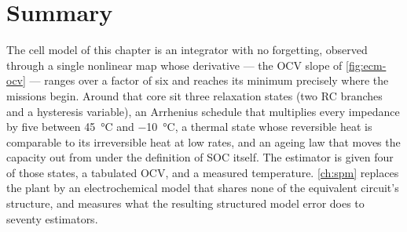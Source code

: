 \section{Summary}

The cell model of this chapter is an integrator with no forgetting, observed through a single
nonlinear map whose derivative --- the OCV slope of \cref{fig:ecm-ocv} --- ranges over a factor of
six and reaches its minimum precisely where the missions begin. Around that core sit three
relaxation states (two RC branches and a hysteresis variable), an Arrhenius schedule that
multiplies every impedance by five between \SI{45}{\celsius} and \SI{-10}{\celsius}, a thermal
state whose reversible heat is comparable to its irreversible heat at low rates, and an ageing
law that moves the capacity out from under the definition of SOC itself. The estimator is given
four of those states, a tabulated OCV, and a measured temperature. \cref{ch:spm} replaces the
plant by an electrochemical model that shares none of the equivalent circuit's structure, and
measures what the resulting structured model error does to seventy estimators.
